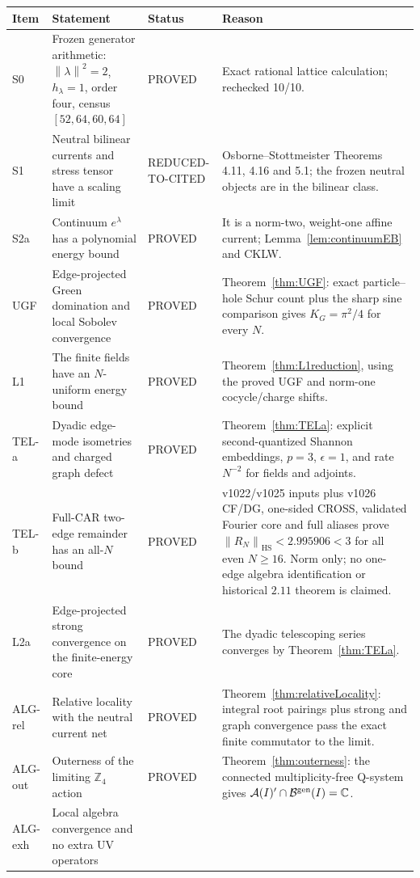 \documentclass[11pt]{article}
\theoremstyle{remark}
\newcommand{\A}{\mathcal A}
\newcommand{\B}{\mathcal B}
\newcommand{\C}{\mathbb C}
\newcommand{\Z}{\mathbb Z}
\newcommand{\HS}{\mathrm{HS}}
\newcommand{\norm}[1]{\left\lVert#1\right\rVert}
\newcommand{\mP}{\textsf{PROVED}}
\newcommand{\mR}{\textsf{REDUCED-TO-CITED}}
\begin{document}
\renewcommand{\arraystretch}{1.15}
\begin{longtable}{@{}p{}p{}p{}p{}@{}}
\toprule
Item & Statement & Status & Reason\\
\midrule
\endhead
S0 & Frozen generator arithmetic:
$\norm{\lambda}^2=2$, $h_\lambda=1$, order four, census
$[52,64,60,64]$ & \mP &
Exact rational lattice calculation; rechecked 10/10.\\
S1 & Neutral bilinear currents and stress tensor have a scaling limit &
\mR &
Osborne--Stottmeister Theorems 4.11, 4.16 and 5.1; the frozen neutral
objects are in the bilinear class.\\
S2a & Continuum $e^\lambda$ has a polynomial energy bound &
\mP &
It is a norm-two, weight-one affine current; Lemma~\ref{lem:continuumEB}
and CKLW.\\
UGF & Edge-projected Green domination and local Sobolev convergence &
\mP &
Theorem~\ref{thm:UGF}: exact particle--hole Schur count plus the sharp
sine comparison gives $K_G=\pi^2/4$ for every $N$.\\
L1 & The finite fields have an $N$-uniform energy bound &
\mP &
Theorem~\ref{thm:L1reduction}, using the proved UGF and norm-one
cocycle/charge shifts.\\
TEL-a & Dyadic edge-mode isometries and charged graph defect &
\mP &
Theorem~\ref{thm:TELa}: explicit second-quantized Shannon embeddings,
$p=3$, $\epsilon=1$, and rate $N^{-2}$ for fields and adjoints.\\
TEL-b & Full-CAR two-edge remainder has an all-$N$ bound &
\mP &
v1022/v1025 inputs plus v1026 CF/DG, one-sided CROSS, validated Fourier
core and full aliases prove $\norm{R_N}_{\HS}<2.995906<3$ for all even
$N\ge16$. Norm only; no one-edge algebra identification or historical
$2.11$ theorem is claimed.\\
L2a & Edge-projected strong convergence on the finite-energy core &
\mP &
The dyadic telescoping series converges by Theorem~\ref{thm:TELa}.\\
ALG-rel & Relative locality with the neutral current net &
\mP &
Theorem~\ref{thm:relativeLocality}: integral root pairings plus strong
and graph convergence pass the exact finite commutator to the limit.\\
ALG-out & Outerness of the limiting $\Z_4$ action &
\mP &
Theorem~\ref{thm:outerness}: the connected multiplicity-free Q-system
gives $\A(I)'\cap\B^{\rm gen}(I)=\C$.\\
ALG-exh & Local algebra convergence and no extra UV operators &

\end{longtable}
\end{document}
